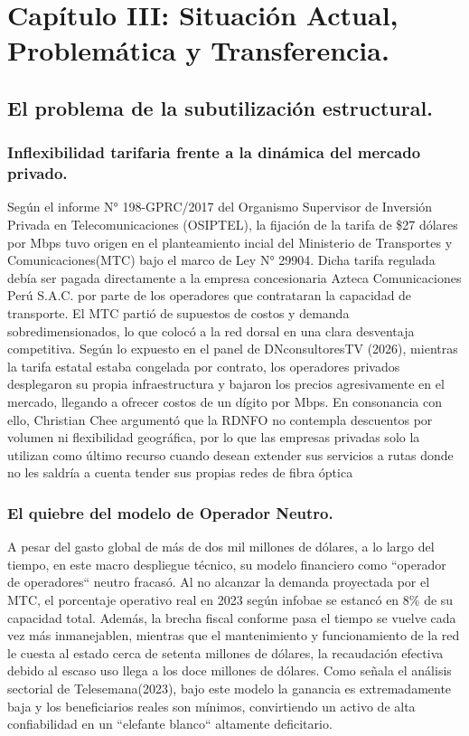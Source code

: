 \section{Capítulo III: Situación Actual, Problemática y Transferencia.}

\subsection{El problema de la subutilización estructural.}
\subsubsection{Inflexibilidad tarifaria frente a la dinámica del mercado privado.}

Según el informe N° 198-GPRC/2017 del Organismo Supervisor de Inversión Privada en Telecomunicaciones 
(OSIPTEL), la fijación de la tarifa de \$27 dólares por Mbps tuvo origen en el planteamiento 
incial del Ministerio de Transportes y Comunicaciones(MTC) bajo el marco de Ley N° 29904.  
Dicha tarifa regulada debía ser pagada directamente a la empresa concesionaria Azteca Comunicaciones Perú
S.A.C. por parte de los operadores que contrataran la capacidad de transporte.
El MTC partió de supuestos de costos y demanda sobredimensionados, lo que colocó a la red dorsal 
en una clara desventaja competitiva.
Según lo expuesto en el panel de DNconsultoresTV (2026), mientras la tarifa estatal 
estaba congelada por contrato, los operadores privados desplegaron su propia infraestructura y bajaron los
precios agresivamente en el mercado, llegando a ofrecer costos de un dígito por Mbps. En consonancia con ello,
Christian Chee argumentó que la RDNFO no contempla descuentos por volumen ni flexibilidad geográfica, por lo que 
las empresas privadas solo la utilizan como último recurso cuando desean extender sus servicios a rutas donde no 
les saldría a cuenta tender sus propias redes de fibra óptica
\subsubsection{El quiebre del modelo de Operador Neutro.}

A pesar del gasto global de más de dos mil millones de dólares, a lo largo del tiempo, en 
este macro despliegue técnico, su modelo financiero como ``operador de operadores`` neutro fracasó.
Al no alcanzar la demanda proyectada por el MTC, el porcentaje operativo real en 2023 según infobae se estancó en 8\%  
de su capacidad total. Además, la brecha fiscal conforme pasa el tiempo se vuelve cada vez más inmanejablen, mientras que el mantenimiento
y funcionamiento de la red le cuesta al estado cerca de setenta millones de dólares, la recaudación
efectiva debido al escaso uso llega a los doce millones de dólares.
Como señala el análisis sectorial de Telesemana(2023), bajo este modelo la ganancia es extremadamente 
baja y los beneficiarios reales son mínimos, 
convirtiendo un activo de alta confiabilidad en un ``elefante blanco`` altamente deficitario.

